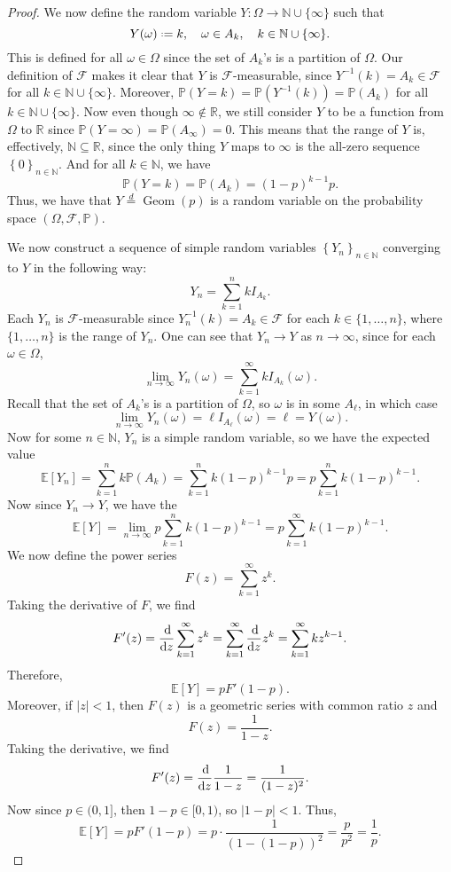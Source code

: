 \documentclass[12pt]{article}
\newcommand*{\defeq}{\mathrel{\vcenter{\baselineskip0.5ex \lineskiplimit0pt\hbox{\scriptsize.}\hbox{\scriptsize.}}}=}
\newcommand{\N}{\mathbb{N}} %
\newcommand{\R}{\mathbb{R}} %
\renewcommand{\P}{\mathbb{P}} %
\newcommand{\FF}{\mathcal{F}} %
\newcommand{\E}{\mathbb{E}} %
\newcommand{\<}{\left\langle} %
\renewcommand{\>}{\right\rangle} %
\newcommand{\seq}[2][n]{\left\{#2\right\}_{#1\in\N}} %
\renewcommand{\d}[1]{\operatorname{d}\!#1} %
\newcommand{\od}[3][1]{\ifnum#1=1{\frac{\d #2}{\d #3}}\else{\frac{\d^{#1}#2}{\d #3^{#1}}}\fi} %
\begin{document}
\begin{proof}
    We now define the random variable $Y : \Omega \to \N\cup\{\infty\}$ such that
    \[Y(\omega) \defeq k, \quad \omega \in A_k, \quad k \in \N\cup\{\infty\}.\]
    This is defined for all $\omega \in \Omega$ since the set of $A_k$'s is a partition of $\Omega$. Our definition of $\FF$ makes it clear that $Y$ is $\FF$-measurable, since $Y^{-1}(k) = A_k \in \FF$ for all $k\in \N\cup\{\infty\}$. Moreover, $\P(Y = k) = \P(Y^{-1}(k)) = \P(A_k)$ for all $k\in \N\cup\{\infty\}$. Now even though $\infty \notin \R$, we still consider $Y$ to be a function from $\Omega$ to $\R$ since $\P(Y = \infty) = \P(A_\infty) = 0$. This means that the range of $Y$ is, effectively, $\N \subseteq \R$, since the only thing $Y$ maps to $\infty$ is the all-zero sequence $\seq{0}$. And for all $k \in \N$, we have
    \[\P(Y = k) = \P(A_k) = (1 - p)^{k-1}p.\]
    Thus, we have that $Y \overset{d}{=} \operatorname{Geom}(p)$ is a random variable on the probability space $(\Omega, \FF, \P)$.
    
    We now construct a sequence of simple random variables $\seq{Y_n}$ converging to $Y$ in the following way:
    \[Y_n = \sum_{k = 1}^n k I_{A_k}.\]
    Each $Y_n$ is $\FF$-measurable since $Y_n^{-1}(k) = A_k \in \FF$ for each $k \in \{1, \dots, n\}$, where $\{1, \dots, n\}$ is the range of $Y_n$. One can see that $Y_n \to Y$ as $n \to \infty$, since for each $\omega \in \Omega$,
    \[\lim_{n\to \infty} Y_n(\omega) = \sum_{k = 1}^\infty k I_{A_k}(\omega).\]
    Recall that the set of $A_k$'s is a partition of $\Omega$, so $\omega$ is in some $A_\ell$, in which case
    \[\lim_{n\to \infty} Y_n(\omega) = \ell I_{A_\ell}(\omega) = \ell = Y(\omega).\]
    Now for some $n \in \N$, $Y_n$ is a simple random variable, so we have the expected value
    \[\E[Y_n] = \sum_{k = 1}^n k \P(A_k) = \sum_{k = 1}^n k(1 - p)^{k-1}p = p\sum_{k = 1}^n k(1 - p)^{k-1}.\]
    Now since $Y_n \to Y$, we have the
    \[\E[Y] = \lim_{n\to \infty} p\sum_{k = 1}^n k(1 - p)^{k-1} = p\sum_{k = 1}^\infty k(1 - p)^{k-1}.\]
    We now define the power series
    \[F(z) = \sum_{k = 1}^\infty z^k.\]
    Taking the derivative of $F$, we find
    \[F'(z) = \od{}{z}\sum_{k = 1}^\infty z^k = \sum_{k = 1}^\infty \od{}{z}z^k = \sum_{k = 1}^\infty k z^{k-1}.\]
    Therefore,
    \[\E[Y] = p F'(1 - p).\]
    Moreover, if $|z| < 1$, then $F(z)$ is a geometric series with common ratio $z$ and
    \[F(z) = \frac1{1 - z}.\]
    Taking the derivative, we find
    \[F'(z) = \od{}{z} \frac1{1-z} = \frac{1}{(1 - z)^2}.\]
    Now since $p \in (0, 1]$, then $1- p \in [0, 1)$, so $|1 - p| < 1$. Thus,
    \[\E[Y] = p F'(1 - p) = p \cdot \frac1{(1 - (1 - p))^2} = \frac{p}{p^2} = \frac1p.\]
    
\end{proof}
\end{document}
